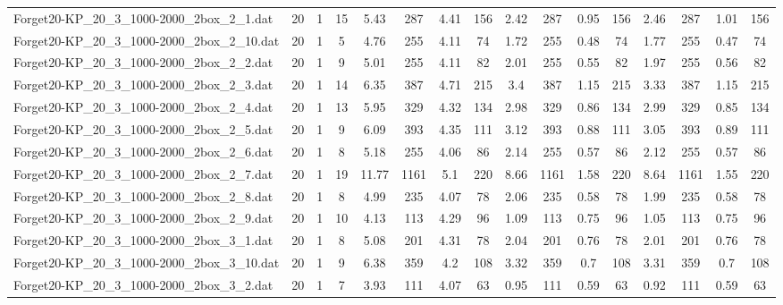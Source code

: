 \begin{sidewaystable}[!ht]
{\begin{tabular}{lccccccccccccccc}
Forget20-KP\_20\_3\_1000-2000\_2box\_2\_1.dat & 20 & 1 & 15 & 5.43 & 287 & 4.41 & 156 & 2.42 & 287 &  \textcolor{blue2}{0.95} & 156 & 2.46 & 287 & 1.01 & 156 \\
Forget20-KP\_20\_3\_1000-2000\_2box\_2\_10.dat & 20 & 1 & 5 & 4.76 & 255 & 4.11 & 74 & 1.72 & 255 & 0.48 & 74 & 1.77 & 255 &  \textcolor{blue2}{0.47} & 74 \\
Forget20-KP\_20\_3\_1000-2000\_2box\_2\_2.dat & 20 & 1 & 9 & 5.01 & 255 & 4.11 & 82 & 2.01 & 255 &  \textcolor{blue2}{0.55} & 82 & 1.97 & 255 & 0.56 & 82 \\
Forget20-KP\_20\_3\_1000-2000\_2box\_2\_3.dat & 20 & 1 & 14 & 6.35 & 387 & 4.71 & 215 & 3.4 & 387 &  \textcolor{blue2}{1.15} & 215 & 3.33 & 387 &  \textcolor{blue2}{1.15} & 215 \\
Forget20-KP\_20\_3\_1000-2000\_2box\_2\_4.dat & 20 & 1 & 13 & 5.95 & 329 & 4.32 & 134 & 2.98 & 329 & 0.86 & 134 & 2.99 & 329 &  \textcolor{blue2}{0.85} & 134 \\
Forget20-KP\_20\_3\_1000-2000\_2box\_2\_5.dat & 20 & 1 & 9 & 6.09 & 393 & 4.35 & 111 & 3.12 & 393 &  \textcolor{blue2}{0.88} & 111 & 3.05 & 393 & 0.89 & 111 \\
Forget20-KP\_20\_3\_1000-2000\_2box\_2\_6.dat & 20 & 1 & 8 & 5.18 & 255 & 4.06 & 86 & 2.14 & 255 &  \textcolor{blue2}{0.57} & 86 & 2.12 & 255 &  \textcolor{blue2}{0.57} & 86 \\
Forget20-KP\_20\_3\_1000-2000\_2box\_2\_7.dat & 20 & 1 & 19 & 11.77 & 1161 & 5.1 & 220 & 8.66 & 1161 & 1.58 & 220 & 8.64 & 1161 &  \textcolor{blue2}{1.55} & 220 \\
Forget20-KP\_20\_3\_1000-2000\_2box\_2\_8.dat & 20 & 1 & 8 & 4.99 & 235 & 4.07 & 78 & 2.06 & 235 &  \textcolor{blue2}{0.58} & 78 & 1.99 & 235 &  \textcolor{blue2}{0.58} & 78 \\
Forget20-KP\_20\_3\_1000-2000\_2box\_2\_9.dat & 20 & 1 & 10 & 4.13 & 113 & 4.29 & 96 & 1.09 & 113 &  \textcolor{blue2}{0.75} & 96 & 1.05 & 113 &  \textcolor{blue2}{0.75} & 96 \\
Forget20-KP\_20\_3\_1000-2000\_2box\_3\_1.dat & 20 & 1 & 8 & 5.08 & 201 & 4.31 & 78 & 2.04 & 201 & 0.76 & 78 & 2.01 & 201 & 0.76 & 78 \\
Forget20-KP\_20\_3\_1000-2000\_2box\_3\_10.dat & 20 & 1 & 9 & 6.38 & 359 & 4.2 & 108 & 3.32 & 359 &  \textcolor{blue2}{0.7} & 108 & 3.31 & 359 &  \textcolor{blue2}{0.7} & 108 \\
Forget20-KP\_20\_3\_1000-2000\_2box\_3\_2.dat & 20 & 1 & 7 & 3.93 & 111 & 4.07 & 63 & 0.95 & 111 &  \textcolor{blue2}{0.59} & 63 & 0.92 & 111 &  \textcolor{blue2}{0.59} & 63 \\

\end{tabular}}
\end{sidewaystable}

